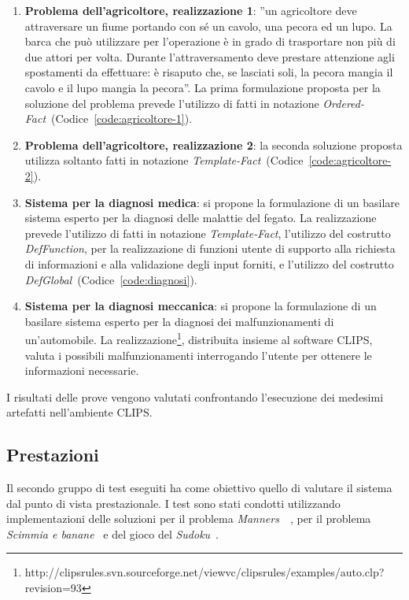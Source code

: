 \begin{enumerate}
	\item \textbf{Problema dell'agricoltore, realizzazione 1}: ''un agricoltore deve attraversare un fiume portando con sé un cavolo, una pecora ed un lupo. La barca che può utilizzare per l'operazione è in grado di trasportare non più di due attori per volta. Durante l'attraversamento deve prestare attenzione agli spostamenti da effettuare: è risaputo che, se lasciati soli, la pecora mangia il cavolo e il lupo mangia la pecora''. La prima formulazione proposta per la soluzione del problema prevede l'utilizzo di fatti in notazione \emph{Ordered-Fact}~(Codice~\ref{code:agricoltore-1}).
	
	\item \textbf{Problema dell'agricoltore, realizzazione 2}: la seconda soluzione proposta utilizza soltanto fatti in notazione \emph{Template-Fact}~(Codice~\ref{code:agricoltore-2}).

	\item \textbf{Sistema per la diagnosi medica}: si propone la formulazione di un basilare sistema esperto per la diagnosi delle malattie del fegato. La realizzazione prevede l'utilizzo di fatti in notazione \emph{Template-Fact}, l'utilizzo del costrutto \emph{DefFunction}, per la realizzazione di funzioni utente di supporto alla richiesta di informazioni e alla validazione degli input forniti, e l'utilizzo del costrutto \emph{DefGlobal}~(Codice~\ref{code:diagnosi}).
	
	\item \textbf{Sistema per la diagnosi meccanica}: si propone la formulazione di un basilare sistema esperto per la diagnosi dei malfunzionamenti di un'automobile. La realizzazione\footnote{http://clipsrules.svn.sourceforge.net/viewvc/clipsrules/examples/auto.clp?revision=93}, distribuita insieme al software CLIPS, valuta i possibili malfunzionamenti interrogando l'utente per ottenere le informazioni necessarie.

\end{enumerate}

I risultati delle prove vengono valutati confrontando l'esecuzione dei medesimi artefatti nell'ambiente CLIPS.

\subsection{Prestazioni}

Il secondo gruppo di test eseguiti ha come obiettivo quello di valutare il sistema dal punto di vista prestazionale. I test sono stati condotti utilizzando implementazioni delle soluzioni per il problema \emph{Manners}~\cite{brantetal91}~\cite{ops5bench}, per il problema \emph{Scimmia e banane}~\cite{clipsmab} e del gioco del \emph{Sudoku}~\cite{clipssudoku}.

